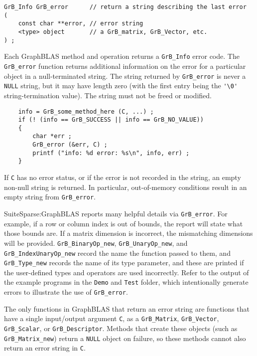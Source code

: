 \documentclass[12pt]{article}
\begin{document}
\begin{mdframed}[userdefinedwidth=6in]
{\footnotesize
\begin{verbatim}
GrB_Info GrB_error      // return a string describing the last error
( 
    const char **error, // error string
    <type> object       // a GrB_matrix, GrB_Vector, etc.
) ;
\end{verbatim}
}\end{mdframed}

Each GraphBLAS method and operation returns a \verb'GrB_Info' error code.  The
\verb'GrB_error' function returns additional information on the error for a
particular object in a null-terminated string.  The string returned by
\verb'GrB_error' is never a \verb'NULL' string, but it may have length zero
(with the first entry being the \verb"'\0'" string-termination value).  The
string must not be freed or modified.

    {\footnotesize
    \begin{verbatim}
    info = GrB_some_method_here (C, ...) ;
    if (! (info == GrB_SUCCESS || info == GrB_NO_VALUE))
    {
        char *err ;
        GrB_error (&err, C) ;
        printf ("info: %d error: %s\n", info, err) ;
    } \end{verbatim}}

If \verb'C' has no error status, or if the error is not recorded in
the string, an empty non-null string is returned.  In particular,
out-of-memory conditions result in an empty string from \verb'GrB_error'.

SuiteSparse:GraphBLAS reports many helpful details via \verb'GrB_error'.  For
example, if a row or column index is out of bounds, the report will state what
those bounds are.  If a matrix dimension is incorrect, the mismatching
dimensions will be provided.  \verb'GrB_BinaryOp_new', \verb'GrB_UnaryOp_new',
and \verb'GrB_IndexUnaryOp_new' record the name the function passed to them, and
\verb'GrB_Type_new' records the name of its type parameter, and these are
printed if the user-defined types and operators are used incorrectly.  Refer to
the output of the example programs in the \verb'Demo' and \verb'Test' folder,
which intentionally generate errors to illustrate the use of \verb'GrB_error'.

The only functions in GraphBLAS that return an error string are functions that
have a single input/output argument \verb'C', as a \verb'GrB_Matrix',
\verb'GrB_Vector', \verb'GrB_Scalar', or \verb'GrB_Descriptor'. Methods that
create these objects (such as \verb'GrB_Matrix_new') return a \verb'NULL'
object on failure, so these methods cannot also return an error string in
\verb'C'.
\end{document}
